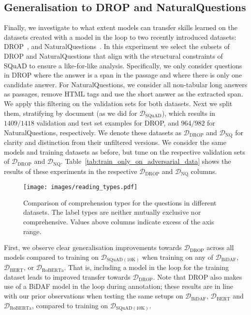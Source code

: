 \documentclass[11pt,a4paper]{article}
\newcommand{\dataset}[1]{\ensuremath{\mathcal{D_{\mathrm{#1}}}}}
\newcommand{\squad}{SQuAD}
\newcommand{\drop}{DROP}
\newcommand{\naturalquestions}{NaturalQuestions}
\begin{document}
\subsection{Generalisation to DROP and NaturalQuestions}
Finally, we investigate to what extent models can transfer skills learned on the datasets created with a model in the loop to two recently introduced datasets: \drop{}~\cite{dua2019drop}, and \naturalquestions{}~\cite{kwiatkowski-etal-2019-natural}.
In this experiment we select the subsets of \drop{} and \naturalquestions{} that align with the structural constraints of \squad{} to ensure a like-for-like analysis.
Specifically, we only consider questions in \drop{} where the answer is a span in the passage and where there is only one candidate answer. 
For \naturalquestions{}, we consider all non-tabular long answers as passages, remove HTML tags and use the short answer as the extracted span. 
We apply this filtering on the validation sets for both datasets.
Next we split them, stratifying by document (as we did for \dataset{\squad{}}), which results in $1409 / 1418$ validation and test set examples for \drop{}, and $964 / 982$ for \naturalquestions{}, respectively.
We denote these datasets as \dataset{DROP} and \dataset{NQ} for clarity and distinction from their unfiltered versions. 
We consider the same models and training datasets as before, but tune on the respective validation sets of \dataset{DROP} and \dataset{NQ}.
Table~\ref{tab:train_only_on_adversarial_data} shows the results of these experiments in the respective \dataset{DROP} and \dataset{NQ} columns.


\begin{figure*}[t]
\texttt{[image: images/reading\_types.pdf]}
\caption{Comparison of comprehension types for the questions in different datasets. The label types are neither mutually exclusive nor comprehensive. Values above columns indicate excess of the axis range.}\label{fig:reading_types}
\end{figure*}

First, we observe clear generalisation improvements towards \dataset{DROP} across all models compared to training on \dataset{SQuAD(10K)} when training on any of \dataset{BiDAF}, \dataset{BERT}, or \dataset{RoBERTa}.
That is, including a model in the loop for the training dataset leads to improved transfer towards \dataset{DROP}.
Note that \drop{} also makes use of a BiDAF model in the loop during annotation; these results are in line with our prior observations when testing the same setups on \dataset{BiDAF}, \dataset{BERT} and \dataset{RoBERTa}, compared to training on \dataset{SQuAD(10K)}.
\end{document}
